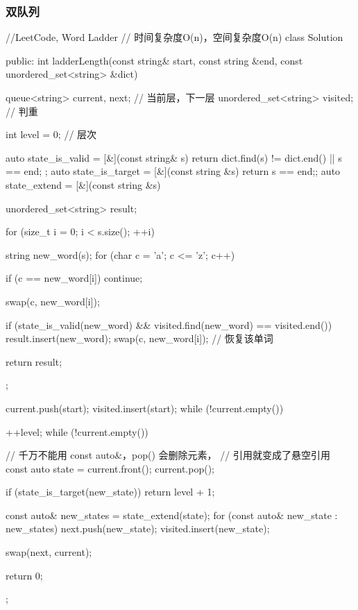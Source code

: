 \subsubsection{双队列}
\begin{Code}
//LeetCode, Word Ladder
// 时间复杂度O(n)，空间复杂度O(n)
class Solution {
public:
    int ladderLength(const string& start, const string &end,
            const unordered_set<string> &dict) {
        queue<string> current, next;    // 当前层，下一层
        unordered_set<string> visited;  // 判重

        int level = 0;  // 层次

        auto state_is_valid = [&](const string& s) {
            return dict.find(s) != dict.end() || s == end;
        };
        auto state_is_target = [&](const string &s) {return s == end;};
        auto state_extend = [&](const string &s) {
            unordered_set<string> result;

            for (size_t i = 0; i < s.size(); ++i) {
                string new_word(s);
                for (char c = 'a'; c <= 'z'; c++) {
                    if (c == new_word[i]) continue;

                    swap(c, new_word[i]);

                    if (state_is_valid(new_word) &&
                        visited.find(new_word) == visited.end()) {
                        result.insert(new_word);
                    }
                    swap(c, new_word[i]); // 恢复该单词
                }
            }

            return result;
        };

        current.push(start);
        visited.insert(start);
        while (!current.empty()) {
            ++level;
            while (!current.empty()) {
                // 千万不能用 const auto&，pop() 会删除元素，
                // 引用就变成了悬空引用
                const auto state = current.front();
                current.pop();

                if (state_is_target(new_state)) {
                    return level + 1;
                }

                const auto& new_states = state_extend(state);
                for (const auto& new_state : new_states) {
                    next.push(new_state);
                    visited.insert(new_state);
                }
            }
            swap(next, current);
        }
        return 0;
    }
};
\end{Code}


